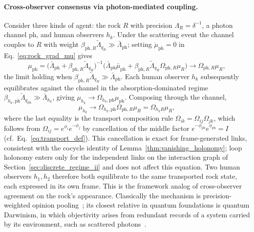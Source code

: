 \documentclass[11pt]{article}
\begin{document}
\paragraph{Cross-observer consensus via photon-mediated coupling.} Consider three kinds of agent: the rock $R$ with precision $\Lambda_R = \delta^{-1}$, a photon channel $\mathrm{ph}$, and human observers $h_k$. Under the scattering event the channel couples to $R$ with weight $\beta_{\mathrm{ph},R}\tilde{\Lambda}_{q_R} \gg \bar{\Lambda}_{\mathrm{ph}}$; setting $\dot{\mu}_{\mathrm{ph}} = 0$ in Eq.~\eqref{eq:rock_grad_mu} gives
\begin{equation}
\mu_{\mathrm{ph}} = \big(\bar{\Lambda}_{\mathrm{ph}} + \beta_{\mathrm{ph},R}\tilde{\Lambda}_{q_R}\big)^{-1}\big(\bar{\Lambda}_{\mathrm{ph}} \bar{\mu}_{\mathrm{ph}} + \beta_{\mathrm{ph},R}\tilde{\Lambda}_{q_R}\Omega_{\mathrm{ph},R}\mu_R\big) \to \Omega_{\mathrm{ph},R} \mu_R,
\end{equation}
the limit holding when $\beta_{\mathrm{ph},R}\tilde{\Lambda}_{q_R} \gg \bar{\Lambda}_{\mathrm{ph}}$.
Each human observer $h_k$ subsequently equilibrates against the channel in the absorption-dominated regime $\beta_{h_k,\mathrm{ph}}\tilde{\Lambda}_{q_{\mathrm{ph}}} \gg \bar{\Lambda}_{h_k}$, giving $\mu_{h_k} \to \Omega_{h_k,\mathrm{ph}}\mu_{\mathrm{ph}}$. Composing through the channel,
\begin{equation}
\mu_{h_k} \to \Omega_{h_k,\mathrm{ph}} \Omega_{\mathrm{ph},R} \mu_R = \Omega_{h_k R} \mu_R,
\label{eq:rock_consensus}
\end{equation}
where the last equality is the transport composition rule $\Omega_{ik} = \Omega_{ij}\Omega_{jk}$, which follows from $\Omega_{ij} = e^{\phi_i}e^{-\phi_j}$ by cancellation of the middle factor $e^{-\phi_{\mathrm{ph}}}e^{\phi_{\mathrm{ph}}} = I$ (cf.\ Eq.~\eqref{eq:transport_def}). This cancellation is exact for frame-generated links, consistent with the cocycle identity of Lemma~\ref{thm:vanishing_holonomy}; loop holonomy enters only for the independent links on the interaction graph of Section~\ref{sec:discrete_regime_ii} and does not affect this equation. Two human observers $h_1, h_2$ therefore both equilibrate to the same transported rock state, each expressed in its own frame. This is the framework analog of cross-observer agreement on the rock's appearance. Classically the mechanism is precision-weighted opinion pooling~\cite{degroot1974}; its closest relative in quantum foundations is quantum Darwinism, in which objectivity arises from redundant records of a system carried by its environment, such as scattered photons~\cite{Zurek2009}.
\end{document}
